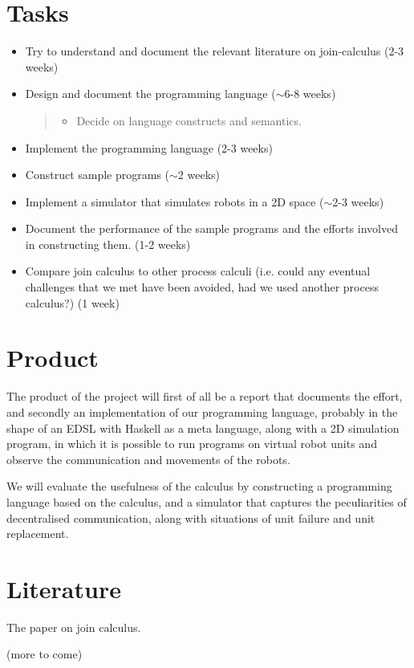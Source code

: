 \section{Tasks}

\begin{itemize}
\item
  Try to understand and document the relevant literature on
  join-calculus (2-3 weeks)

\item
  Design and document the programming language (\ensuremath{\sim}6-8
  weeks)

  \begin{quote}
  \begin{itemize}
  \item
    Decide on language constructs and semantics.
  \end{itemize}
  \end{quote}
\item
  Implement the programming language (2-3 weeks)

\item
  Construct sample programs (\ensuremath{\sim}2 weeks)

\item
  Implement a simulator that simulates robots in a 2D space
  (\ensuremath{\sim}2-3 weeks)

\item
  Document the performance of the sample programs and the efforts
  involved in constructing them. (1-2 weeks)

\item
  Compare join calculus to other process calculi (i.e. could any
  eventual challenges that we met have been avoided, had we used
  another process calculus?) (1 week)

\end{itemize}
\section{Product}

The product of the project will first of all be a report that
documents the effort, and secondly an implementation of our
programming language, probably in the shape of an EDSL with Haskell
as a meta language, along with a 2D simulation program, in which it
is possible to run programs on virtual robot units and observe the
communication and movements of the robots.

We will evaluate the usefulness of the calculus by constructing a
programming language based on the calculus, and a simulator that
captures the peculiarities of decentralised communication, along
with situations of unit failure and unit replacement.

\section{Literature}

The paper on join calculus.

(more to come)

